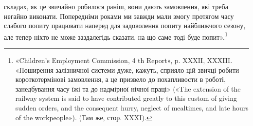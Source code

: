 складах, як це звичайно робилося раніш, вони дають замовлення, які треба негайно виконати.
Попередніми роками ми завжди мали змогу протягом часу
слабого попиту працювати наперед для задоволення попиту найближчого сезону, але тепер ніхто не може
заздалегідь сказати,
на що саме тоді буде попит».\footnote{
«Children’s Employment Commission, 4 th Report», p. XXXII,
XXXIII. «Поширення залізничної системи дуже, кажуть, сприяло цій
звичці робити короткотермінові замовлення, а це призвело до похапливости в роботі, занедбування часу
їжі та до надмірної нічної праці»
(«The extension of the railway system is said to have contributed greatly
to this custom of giving sudden orders, and the consequent hurry, neglect
of mealtimes, and late hours of the workpeople»). (Там же, стор. XXXI).
}
